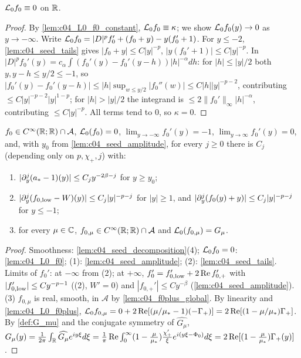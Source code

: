 \begin{lemma}
  \label{lem:c04_L0_f0}
  $\mathcal{L}_0f_0\equiv0$ on $\mathbb{R}$.
\end{lemma}
\begin{proof}
  By \cref{lem:c04_L0_f0_constant}, $\mathcal{L}_0f_0\equiv\kappa$; we show $\mathcal{L}_0f_0(y)\to0$ as $y\to-\infty$. Write
  $\mathcal{L}_0f_0=|D|^pf_0'+(f_0+y)-y(f_0'+1)$. For $y\le-2$, \cref{lem:c04_seed_tails} gives $|f_0+y|\le C|y|^{-p}$,
  $|y(f_0'+1)|\le C|y|^{-p}$. In $|D|^pf_0'(y)=c_\alpha\int(f_0'(y)-f_0'(y-h))|h|^{-\alpha}dh$: for $|h|\le|y|/2$ both $y,y-h\le y/2\le-1$, so
  $|f_0'(y)-f_0'(y-h)|\le|h|\sup_{w\le y/2}|f_0''(w)|\le C|h||y|^{-p-2}$, contributing $\le C|y|^{-p-2}|y|^{1-p}$; for $|h|>|y|/2$ the
  integrand is $\le2\|f_0'\|_\infty|h|^{-\alpha}$, contributing $\le C|y|^{-p}$. All terms tend to $0$, so $\kappa=0$.
\end{proof}

\begin{lemma}
  \label{lem:approx_linear_seed}
  $f_0\in C^\infty(\mathbb{R};\mathbb{R})\cap\mathcal A$, $\mathcal{L}_0(f_0)=0$, $\lim_{y\to-\infty}f_0'(y)=-1$, $\lim_{y\to\infty}f_0'(y)=0$, and, with
  $y_0$ from \cref{lem:c04_seed_amplitude}, for every $j\ge0$ there is $C_j$ (depending only on $p,\chi_+,j$) with:
  \begin{enumerate}
    \item $|\partial_y^j(a_*-1)(y)|\le C_jy^{-2\beta-j}$ for $y\ge y_0$;
    \item $|\partial_y^j(f_{0,\textup{low}}-W)(y)|\le C_j|y|^{-p-j}$ for $|y|\ge1$, and $|\partial_y^j(f_0(y)+y)|\le C_j|y|^{-p-j}$ for $y\le-1$;
    \item for every $\mu\in\mathbb{C}$, $f_{0,\mu}\in C^\infty(\mathbb{R};\mathbb{R})\cap\mathcal A$ and $\mathcal{L}_0(f_{0,\mu})=G_\mu$.
  \end{enumerate}
\end{lemma}
\begin{proof}
  Smoothness: \cref{lem:c04_seed_decomposition}(4); $\mathcal{L}_0f_0=0$: \cref{lem:c04_L0_f0}; (1): \cref{lem:c04_seed_amplitude};
  (2): \cref{lem:c04_seed_tails}. Limits of $f_0'$: at $-\infty$ from (2); at $+\infty$, $f_0'=f_{0,\textup{low}}'+2\operatorname{Re}f_{0,+}'$ with
  $|f_{0,\textup{low}}'|\le Cy^{-p-1}$ ((2), $W'=0$) and $|f_{0,+}'|\le Cy^{-\beta}$ (\cref{lem:c04_seed_amplitude}).
  (3) $f_{0,\mu}$ is real, smooth, in $\mathcal A$ by \cref{lem:c04_f0plus_global}. By linearity and \cref{lem:c04_L0_f0plus},
  $\mathcal{L}_0f_{0,\mu}=0+2\operatorname{Re}[(\mu/\mu_*-1)(-\Gamma_+)]=2\operatorname{Re}[(1-\mu/\mu_*)\Gamma_+]$. By \cref{def:G_mu} and the conjugate
  symmetry of $\widehat{G_\mu}$, $G_\mu(y)=\frac1{2\pi}\int_{\mathbb{R}}\widehat{G_\mu}e^{iy\xi}d\xi=\frac1\pi\operatorname{Re}\int_0^\infty(1-\frac\mu{\mu_*})\frac{\chi_+'}\xi e^{i(y\xi-\Phi_0)}d\xi=2\operatorname{Re}[(1-\frac\mu{\mu_*})\Gamma_+(y)]$.
\end{proof}


